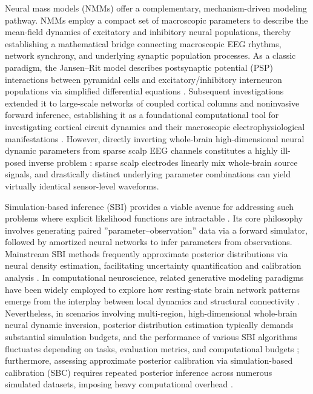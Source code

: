 \documentclass{article}
\begin{document}
Neural mass models (NMMs) offer a complementary, mechanism-driven modeling pathway. 
NMMs employ a compact set of macroscopic parameters to describe the mean-field dynamics of excitatory and inhibitory neural populations, thereby establishing a mathematical bridge connecting macroscopic EEG rhythms, network synchrony, and underlying synaptic population processes. 
As a classic paradigm, the Jansen--Rit model describes postsynaptic potential (PSP) interactions between pyramidal cells and excitatory/inhibitory interneuron populations via simplified differential equations \citep{jansen1995electroencephalogram}. 
Subsequent investigations extended it to large-scale networks of coupled cortical columns and noninvasive forward inference, establishing it as a foundational computational tool for investigating cortical circuit dynamics and their macroscopic electrophysiological manifestations \citep{david2003modeling}. 
However, directly inverting whole-brain high-dimensional neural dynamic parameters from sparse scalp EEG channels constitutes a highly ill-posed inverse problem \citep{grech2008review,michel2019eegsource}: 
sparse scalp electrodes linearly mix whole-brain source signals, and drastically distinct underlying parameter combinations can yield virtually identical sensor-level waveforms.

Simulation-based inference (SBI) provides a viable avenue for addressing such problems where explicit likelihood functions are intractable \citep{cranmer2020frontier,sun2024seizure}. 
Its core philosophy involves generating paired ''parameter--observation'' data via a forward simulator, followed by amortized neural networks to infer parameters from observations. 
Mainstream SBI methods frequently approximate posterior distributions via neural density estimation, facilitating uncertainty quantification and calibration analysis \citep{goncalves2020training,tejero2020sbi,boelts2024sbireloaded}. 
In computational neuroscience, related generative modeling paradigms have been widely employed to explore how resting-state brain network patterns emerge from the interplay between local dynamics and structural connectivity \citep{deco2011emerging,sanzleon2013virtualbrain}. 
Nevertheless, in scenarios involving multi-region, high-dimensional whole-brain neural dynamic inversion, posterior distribution estimation typically demands substantial simulation budgets, and the performance of various SBI algorithms fluctuates depending on tasks, evaluation metrics, and computational budgets \citep{lueckmann2021benchmarking}; furthermore, assessing approximate posterior calibration via simulation-based calibration (SBC) requires repeated posterior inference across numerous simulated datasets, imposing heavy computational overhead \citep{talts2018sbc}. 
\end{document}
